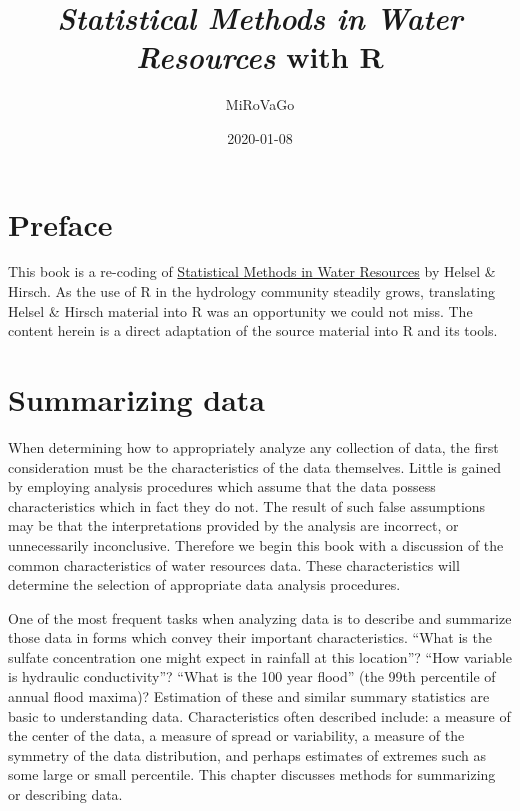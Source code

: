 \documentclass[]{book}
\title{\emph{Statistical Methods in Water Resources} with R}
\author{MiRoVaGo}
\date{2020-01-08}
\begin{document}
\maketitle

{
\setcounter{tocdepth}{1}
\tableofcontents
}
\hypertarget{preface}{%
\chapter*{Preface}\label{preface}}

This book is a re-coding of \href{https://pubs.usgs.gov/twri/twri4a3/}{Statistical Methods in Water Resources} by Helsel \& Hirsch. As the use of R in the hydrology community steadily grows, translating Helsel \& Hirsch material into R was an opportunity we could not miss. The content herein is a direct adaptation of the source material into R and its tools.

\hypertarget{ch1}{%
\chapter{Summarizing data}\label{ch1}}

When determining how to appropriately analyze any collection of data, the first consideration must be the characteristics of the data themselves. Little is gained by employing analysis procedures which assume that the data possess characteristics which in fact they do not. The result of such false assumptions may be that the interpretations provided by the analysis are incorrect, or unnecessarily inconclusive. Therefore we begin this book with a discussion of the common characteristics of water resources data. These characteristics will determine the selection of appropriate data analysis procedures.

One of the most frequent tasks when analyzing data is to describe and summarize those data in forms which convey their important characteristics. ``What is the sulfate concentration one might expect in rainfall at this location''? ``How variable is hydraulic conductivity''? ``What is the 100 year flood'' (the 99th percentile of annual flood maxima)? Estimation of these and similar summary statistics are basic to understanding data. Characteristics often described include: a measure of the center of the data, a measure of spread or variability, a measure of the symmetry of the data distribution, and perhaps estimates of extremes such as some large or small percentile. This chapter discusses methods for summarizing or describing data.
\end{document}
